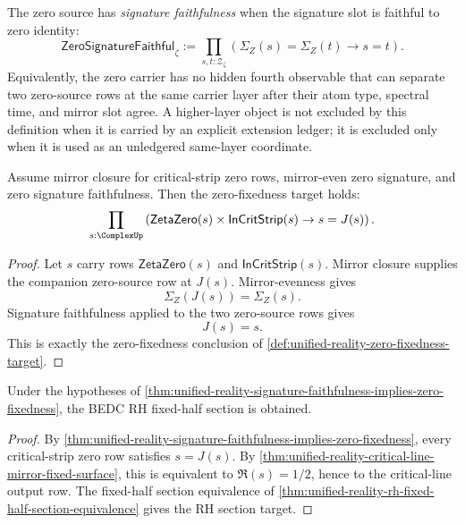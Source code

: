 \begin{definition}
\label{def:unified-reality-zero-signature-faithfulness}
The zero source has \emph{signature faithfulness} when the signature slot
is faithful to zero identity:
$$
\mathsf{ZeroSignatureFaithful}_{\zeta}
:=
\prod_{s,t:\mathcal Z_{\zeta}}
\left(
\Sigma_Z(s)=\Sigma_Z(t)
\to
s=t
\right).
$$
Equivalently, the zero carrier has no hidden fourth observable that can
separate two zero-source rows at the same carrier layer after their atom
type, spectral time, and mirror slot agree.  A higher-layer object is
not excluded by this definition when it is carried by an explicit
extension ledger; it is excluded only when it is used as an unledgered
same-layer coordinate.
\end{definition}

\begin{theorem}
\label{thm:unified-reality-signature-faithfulness-implies-zero-fixedness}
Assume mirror closure for critical-strip zero rows, mirror-even zero
signature, and zero signature faithfulness.  Then the zero-fixedness
target holds:
$$
\prod_{s:\ComplexUp}
\left(
\mathsf{ZetaZero}(s)\times\mathsf{InCritStrip}(s)
\to
s=J(s)
\right).
$$
\end{theorem}

\begin{proof}
Let $s$ carry rows $\mathsf{ZetaZero}(s)$ and
$\mathsf{InCritStrip}(s)$.  Mirror closure supplies the companion
zero-source row at $J(s)$.  Mirror-evenness gives
$$
\Sigma_Z(J(s))=\Sigma_Z(s).
$$
Signature faithfulness applied to the two zero-source rows gives
$$
J(s)=s.
$$
This is exactly the zero-fixedness conclusion of
\autoref{def:unified-reality-zero-fixedness-target}.
\end{proof}

\begin{corollary}
\label{cor:unified-reality-signature-faithfulness-gives-rh-section}
Under the hypotheses of
\autoref{thm:unified-reality-signature-faithfulness-implies-zero-fixedness},
the BEDC RH fixed-half section is obtained.
\end{corollary}

\begin{proof}
By
\autoref{thm:unified-reality-signature-faithfulness-implies-zero-fixedness},
every critical-strip zero row satisfies $s=J(s)$.  By
\autoref{thm:unified-reality-critical-line-mirror-fixed-surface}, this
is equivalent to $\Re(s)=1/2$, hence to the critical-line output row.
The fixed-half section equivalence of
\autoref{thm:unified-reality-rh-fixed-half-section-equivalence} gives
the RH section target.
\end{proof}

